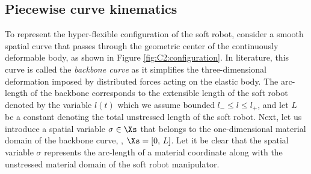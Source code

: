 \subsection{Piecewise curve kinematics}
\noindent To represent the hyper-flexible configuration of the soft robot, consider a smooth spatial curve that passes through the geometric center of the continuously deformable body, as shown in Figure \ref{fig:C2:configuration}. {In literature, this curve is called} the \textit{backbone curve} as it simplifies the three-dimensional deformation imposed by distributed forces acting on the elastic body. The arc-length of the backbone corresponds to the extensible length of the soft robot denoted by the variable $l(t)$ which we assume bounded ${l}_{-}\le l \le {l}_{+}$, and let $L$ be a constant denoting the {total unstressed} length of the soft robot. Next, let us introduce a spatial variable $\sigma \in \Xs$ that belongs to the one-dimensional material domain of the backbone curve, \ie, $\Xs = [0,\, L]$. Let it be clear that the spatial variable $\sigma$ represents the arc-length of a material coordinate along with the unstressed material domain of the soft robot manipulator.

